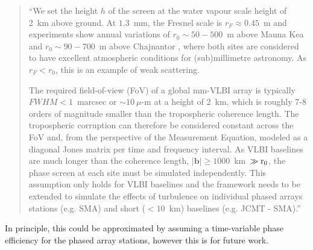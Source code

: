 \begin{quotation}
``We set the height $h$ of the screen at the water vapour scale height of 2~km above ground. At $1.3$~mm, the Fresnel scale is $r_F \approx 0.45$~m and experiments show annual variations of $r_0 \sim 50 - 500$~m above Mauna Kea \citep{Masson_1994} and $r_0 \sim 90 - 700$~m above Chajnantor \citep*{Radford_1998}, where both sites are considered to have excellent atmospheric conditions for (sub)millimetre astronomy. As $r_F < r_0$, this is an example of weak scattering. 


The required field-of-view (FoV) of a global mm-VLBI array is typically $FWHM < 1$~marcsec or $\sim10~\mu$-m at a height of 2~km, which is roughly 7-8 orders of magnitude smaller than the tropospheric coherence length. The tropospheric corruption can therefore be considered constant across the FoV and, from the perspective of the Measurement Equation, modeled as a diagonal Jones matrix per time and frequency interval. As VLBI baselines are much longer than the coherence length, $|\bm{b}| \ge 1000$~km~$\gg \rm r_0$, the phase screen at each site must be simulated independently. This assumption only holds for VLBI baselines and the framework needs to be extended to simulate the effects of turbulence on individual phased arrays stations (e.g. SMA) and short ($<10$~km) baselines (e.g. JCMT - SMA).'' 
\citep{Blecher_2016}
\end{quotation}
In principle, this could be approximated by assuming a time-variable phase efficiency for the phased array stations, however this is for future work.

